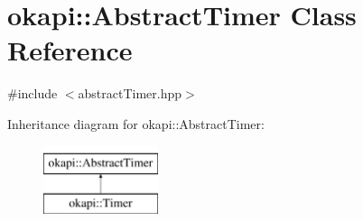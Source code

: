 \hypertarget{classokapi_1_1AbstractTimer}{}\section{okapi\+::Abstract\+Timer Class Reference}
\label{classokapi_1_1AbstractTimer}


{\ttfamily \#include $<$abstract\+Timer.\+hpp$>$}

Inheritance diagram for okapi\+::Abstract\+Timer\+:\begin{figure}[H]
\begin{center}
\leavevmode
\includegraphics[height=2.000000cm]{classokapi_1_1AbstractTimer}
\end{center}
\end{figure}
